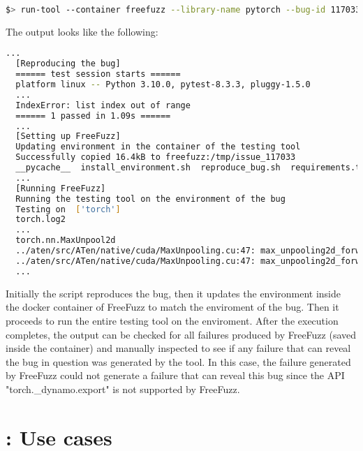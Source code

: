 \documentclass[sigconf,screen]{acmart}
\begin{document}
\begin{lstlisting}[language=bash]
  $> run-tool --container freefuzz --library-name pytorch --bug-id 117033 --run-script tool-integration/FreeFuzz/run_freefuzz_docker.sh
\end{lstlisting}

The output looks like the following:

\begin{lstlisting}[language=bash]
  ...
  [Reproducing the bug]
  ====== test session starts ======
  platform linux -- Python 3.10.0, pytest-8.3.3, pluggy-1.5.0
  ...
  IndexError: list index out of range
  ====== 1 passed in 1.09s ======
  ...
  [Setting up FreeFuzz]
  Updating environment in the container of the testing tool
  Successfully copied 16.4kB to freefuzz:/tmp/issue_117033
  __pycache__  install_environment.sh  reproduce_bug.sh  requirements.txt  test_issue_117033.py
  ...
  [Running FreeFuzz]
  Running the testing tool on the environment of the bug
  Testing on  ['torch']
  torch.log2
  ...
  torch.nn.MaxUnpool2d
  ../aten/src/ATen/native/cuda/MaxUnpooling.cu:47: max_unpooling2d_forward_kernel: block: [0,0,0], thread: [1,0,0] Assertion `maxind >= 0 && maxind < outputImageSize` failed.
  ../aten/src/ATen/native/cuda/MaxUnpooling.cu:47: max_unpooling2d_forward_kernel: block: [0,0,0], thread: [2,0,0] Assertion `maxind >= 0 && maxind < outputImageSize` failed.
  ...
\end{lstlisting}

Initially the script reproduces the bug, then it updates the environment inside the docker container of FreeFuzz to match the enviroment of the bug. Then it proceeds to run the entire testing tool on the enviroment. After the execution completes, the output can be checked for all failures produced by FreeFuzz (saved inside the container) and manually inspected to see if any failure that can reveal the bug in question was generated by the tool. In this case, the failure generated by FreeFuzz could not generate a failure that can reveal this bug since the API "torch.\_dynamo.export" is not supported by FreeFuzz.


\section{\tname: Use cases}

\end{document}
